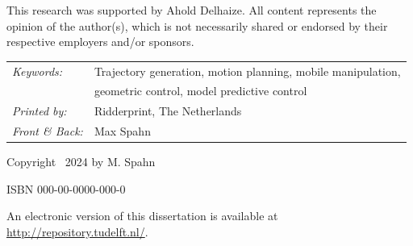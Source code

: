 \begin{titlepage}
This research was supported by Ahold Delhaize. All content represents the opinion
of the author(s), which is not necessarily shared or endorsed by their respective
employers and/or sponsors.

\noindent
\begin{tabular}{l l}
    \textit{Keywords:} & Trajectory generation, motion
    planning, mobile manipulation, \\
    & geometric control, model
    predictive control\\[\medskipamount]
    \textit{Printed by:} & Ridderprint, The Netherlands \\[\medskipamount]
    \textit{Front \& Back:} & Max Spahn
\end{tabular}

\vspace{4\bigskipamount}

\noindent Copyright \textcopyright\ 2024 by M. Spahn


\medskip
\noindent ISBN 000-00-0000-000-0

\medskip
\noindent An electronic version of this dissertation is available at \\
\url{http://repository.tudelft.nl/}.

\end{titlepage}


